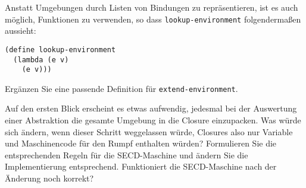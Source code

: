 \begin{aufgabe}
  Anstatt Umgebungen durch Listen von Bindungen zu repräsentieren, ist
  es auch möglich, Funktionen zu verwenden, so dass
  \texttt{lookup-environment} folgendermaßen aussieht:
\begin{verbatim}
(define lookup-environment
  (lambda (e v)
    (e v)))
\end{verbatim}
  Ergänzen Sie eine passende Definition für
  \texttt{extend-environment}.
\end{aufgabe}

\begin{aufgabe}
  Auf den ersten Blick erscheint es etwas aufwendig, jedesmal bei der
  Auswertung einer Abstraktion die gesamte Umgebung in die Closure
  einzupacken.  Was würde sich ändern, wenn dieser Schritt weggelassen
  würde, Closures also nur Variable und Maschinencode für den Rumpf
  enthalten würden?  Formulieren Sie die entsprechenden Regeln für die
  SECD-Maschine und ändern Sie die Implementierung entsprechend.
  Funktioniert die SECD-Maschine nach der Änderung noch korrekt?
\end{aufgabe}


